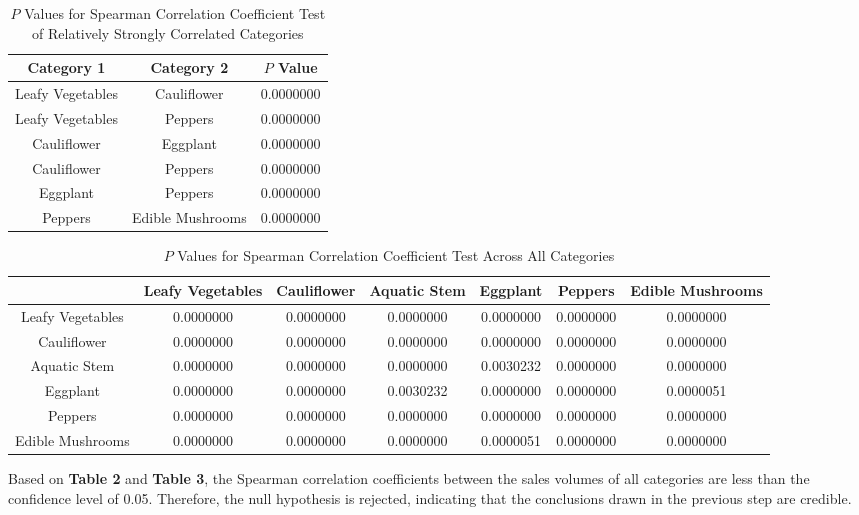 \documentclass{article}
\begin{document}
	\begin{table}[htbp]
		\centering
		\caption{\(P\) Values for Spearman Correlation Coefficient Test of Relatively Strongly Correlated Categories}
		\label{tab:spearman_p_strong}
		\renewcommand{\arraystretch}{1.5}
		\renewcommand{\heavyrulewidth}{1.2pt}
		\begin{tabular}{ccc}
			\toprule
			Category 1 & Category 2 & \(P\) Value \\
			\midrule
			Leafy Vegetables & Cauliflower & 0.0000000 \\
			Leafy Vegetables & Peppers & 0.0000000 \\
			Cauliflower & Eggplant & 0.0000000 \\
			Cauliflower & Peppers & 0.0000000 \\
			Eggplant & Peppers & 0.0000000 \\
			Peppers & Edible Mushrooms & 0.0000000 \\
			\bottomrule
		\end{tabular}
		\renewcommand{\heavyrulewidth}{0.8pt}
	\end{table}
	
	\begin{table}[htbp]
		\centering
		\caption{\(P\) Values for Spearman Correlation Coefficient Test Across All Categories}
		\label{tab:spearman_p_all}
		\renewcommand{\arraystretch}{1.5}
		\renewcommand{\heavyrulewidth}{1.2pt}
		\begin{tabular}{ccccccc}
			\toprule
			& Leafy Vegetables & Cauliflower & Aquatic Stem & Eggplant & Peppers & Edible Mushrooms \\
			\midrule
			Leafy Vegetables & 0.0000000 & 0.0000000 & 0.0000000 & 0.0000000 & 0.0000000 & 0.0000000 \\
			Cauliflower & 0.0000000 & 0.0000000 & 0.0000000 & 0.0000000 & 0.0000000 & 0.0000000 \\
			Aquatic Stem & 0.0000000 & 0.0000000 & 0.0000000 & 0.0030232 & 0.0000000 & 0.0000000 \\
			Eggplant & 0.0000000 & 0.0000000 & 0.0030232 & 0.0000000 & 0.0000000 & 0.0000051 \\
			Peppers & 0.0000000 & 0.0000000 & 0.0000000 & 0.0000000 & 0.0000000 & 0.0000000 \\
			Edible Mushrooms & 0.0000000 & 0.0000000 & 0.0000000 & 0.0000051 & 0.0000000 & 0.0000000 \\
			\bottomrule
		\end{tabular}
		\renewcommand{\heavyrulewidth}{0.8pt}
	\end{table}
	
	Based on \textbf{Table 2} and \textbf{Table 3}, the Spearman correlation coefficients between the sales volumes of all categories are less than the confidence level of 0.05. Therefore, the null hypothesis is rejected, indicating that the conclusions drawn in the previous step are credible.
\end{document}
